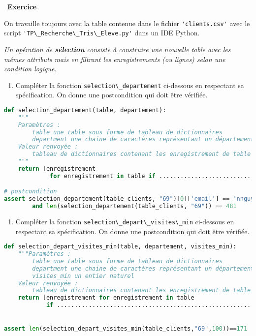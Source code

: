\documentclass[
  11pt,
]{article}
\newcommand{\passthrough}[1]{#1}
\providecommand{\tightlist}{%
  \setlength{\itemsep}{0pt}\setlength{\parskip}{0pt}}
\newcounter{exo}
\newenvironment{exercice}[1]
{\par \medskip   \addtocounter{exo}{1} \noindent  
\begin{bclogo}[arrondi =0.1,   noborder = true, logo=\bccrayon, marge=4]{~\textbf{Exercice} \textbf{\theexo} {\itshape #1} }  \par}
{
\end{bclogo}
 \par \bigskip }
\newcounter{def}
\newcounter{logi}
\begin{document}
\begin{exercice}{}

On travaille toujours avec la table contenue dans le fichier
\passthrough{\lstinline!'clients.csv'!} avec le script
\passthrough{\lstinline!'TP\_Recherche\_Tris\_Eleve.py'!} dans un IDE
Python.

\emph{Un opération de \textbf{sélection} consiste à construire une
nouvelle table avec les mêmes attributs mais en filtrant les
enregistrements (ou lignes) selon une condition logique.}

\begin{enumerate}
\def\labelenumi{\arabic{enumi}.}
\tightlist
\item
  Compléter la fonction \passthrough{\lstinline!selection\_departement!}
  ci-dessous en respectant sa spécification. On donne une postcondition
  qui doit être vérifiée.
\end{enumerate}

\begin{lstlisting}[language=Python]
def selection_departement(table, departement):
    """
    Paramètres : 
        table une table sous forme de tableau de dictionnaires
        department une chaine de caractères représentant un département
    Valeur renvoyée :
        tableau de dictionnaires contenant les enregistrement de table dont l'attribut "département"  a la valeur passée en paramètre
    """
    return [enregistrement
             for enregistrement in table if ......................................    ]

# postcondition
assert selection_departement(table_clients, "69")[0]['email'] == 'nnguyen@noos.fr' \
        and len(selection_departement(table_clients, "69")) == 481
\end{lstlisting}

\begin{enumerate}
\def\labelenumi{\arabic{enumi}.}
\setcounter{enumi}{1}
\tightlist
\item
  Compléter la fonction
  \passthrough{\lstinline!selection\_depart\_visites\_min!} ci-dessous
  en respectant sa spécification. On donne une postcondition qui doit
  être vérifiée.
\end{enumerate}

\begin{lstlisting}[language=Python]
def selection_depart_visites_min(table, departement, visites_min):
    """Paramètres : 
        table une table sous forme de tableau de dictionnaires
        department une chaine de caractères représentant un département
        visites_min un entier naturel 
    Valeur renvoyée :
        tableau de dictionnaires contenant les enregistrement de table dont l'attribut "département"  a la valeur passée en paramètre et l'attribut visites est >= visites_min"""
    return [enregistrement for enregistrement in table 
            if ........................................................]         


assert len(selection_depart_visites_min(table_clients,"69",100))==171
\end{lstlisting}

\end{exercice}
\end{document}
